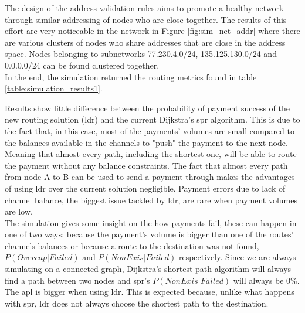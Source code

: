 The design of the address validation rules aims to promote a healthy network through similar addressing of nodes who are close together. The results of this effort are very noticeable in the network in Figure \ref{fig:sim_net_addr} where there are various clusters of nodes who share addresses that are close in the address space. Nodes belonging to subnetworks 77.230.4.0/24, 135.125.130.0/24 and 0.0.0.0/24 can be found clustered together.\\
In the end, the simulation returned the routing metrics found in table \ref{table:simulation_results1}.

\begin{table}[H]
\centering
{}
\caption{Results for the first simulation}
\label{table:simulation_results1}
\end{table}

Results show little difference between the probability of payment success of the new routing solution (\acrshort{ldr}) and the current Dijkstra's \acrfull{spr} algorithm. This is due to the fact that, in this case, most of the payments' volumes are small compared to the balances available in the channels to "push" the payment to the next node. Meaning that almost every path, including the shortest one, will be able to route the payment without any balance constraints. The fact that almost every path from node A to B can be used to send a payment through makes the advantages of using \acrshort{ldr} over the current solution negligible. Payment errors due to lack of channel balance, the biggest issue tackled by \acrshort{ldr}, are rare when payment volumes are low.\\
The simulation gives some insight on the how payments fail, these can happen in one of two ways; because the payment's volume is bigger than one of the routes' channels balances or because a route to the destination was not found, $P(Overcap|Failed)$ and $P(NonExis|Failed)$ respectively. Since we are always simulating on a connected graph, Dijkstra's shortest path algorithm will always find a path between two nodes and \acrshort{spr}'s $P(NonExis|Failed)$ will always be 0\%.\\
The \acrfull{apl} is bigger when using \acrshort{ldr}. This is expected because, unlike what happens with \acrshort{spr}, \acrshort{ldr} does not always choose the shortest path to the destination.

